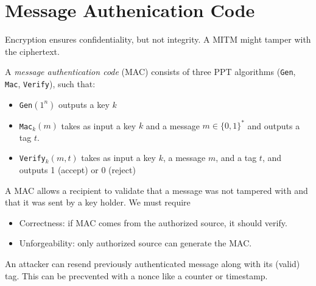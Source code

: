 \section{Message Authenication Code}

Encryption ensures confidentiality, 
but not integrity. A MITM might 
tamper with the ciphertext. 

A \emph{message authentication code} (MAC) consists 
of three PPT algorithms (\texttt{Gen}, \texttt{Mac}, \texttt{Verify}),
such that:
\begin{itemize}
    \item \texttt{Gen}$(1^n)$ outputs a key $k$
    \item \texttt{Mac}$_k(m)$ takes as input a key $k$ and a message $m\in\{0,1\}^*$ and outputs a tag $t$.
    \item \texttt{Verify}$_k(m,t)$ takes as input a key $k$, a message 
    $m$, and a tag $t$, and outputs 1 (accept) or 0 (reject)
\end{itemize}

A MAC allows a recipient to validate that a message 
was not tampered with and that it was sent by a key holder. We must require
\begin{itemize}
    \item Correctness: if MAC comes from the authorized source, it should verify.
    \item Unforgeability: only authorized source can generate the MAC.
\end{itemize}
An attacker can resend previously authenticated message along with its (valid) tag.
This can be precvented with a nonce like a counter or timestamp.

